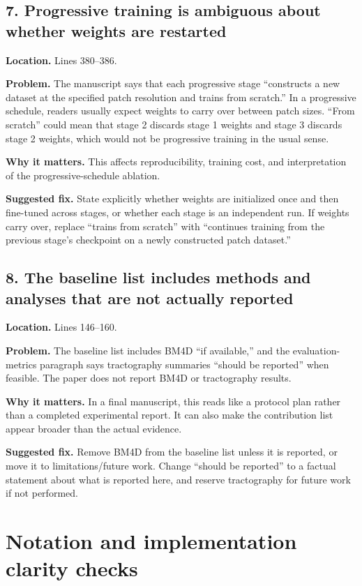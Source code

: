 \documentclass[11pt]{article}
\begin{document}
\subsection*{7. Progressive training is ambiguous about whether weights are restarted}

\textbf{Location.} Lines 380--386.

\textbf{Problem.} The manuscript says that each progressive stage ``constructs a new dataset at the specified patch resolution and trains from scratch.'' In a progressive schedule, readers usually expect weights to carry over between patch sizes. ``From scratch'' could mean that stage 2 discards stage 1 weights and stage 3 discards stage 2 weights, which would not be progressive training in the usual sense.

\textbf{Why it matters.} This affects reproducibility, training cost, and interpretation of the progressive-schedule ablation.

\textbf{Suggested fix.} State explicitly whether weights are initialized once and then fine-tuned across stages, or whether each stage is an independent run. If weights carry over, replace ``trains from scratch'' with ``continues training from the previous stage's checkpoint on a newly constructed patch dataset.''

\subsection*{8. The baseline list includes methods and analyses that are not actually reported}

\textbf{Location.} Lines 146--160.

\textbf{Problem.} The baseline list includes BM4D ``if available,'' and the evaluation-metrics paragraph says tractography summaries ``should be reported'' when feasible. The paper does not report BM4D or tractography results.

\textbf{Why it matters.} In a final manuscript, this reads like a protocol plan rather than a completed experimental report. It can also make the contribution list appear broader than the actual evidence.

\textbf{Suggested fix.} Remove BM4D from the baseline list unless it is reported, or move it to limitations/future work. Change ``should be reported'' to a factual statement about what is reported here, and reserve tractography for future work if not performed.

\section*{Notation and implementation clarity checks}
\end{document}
